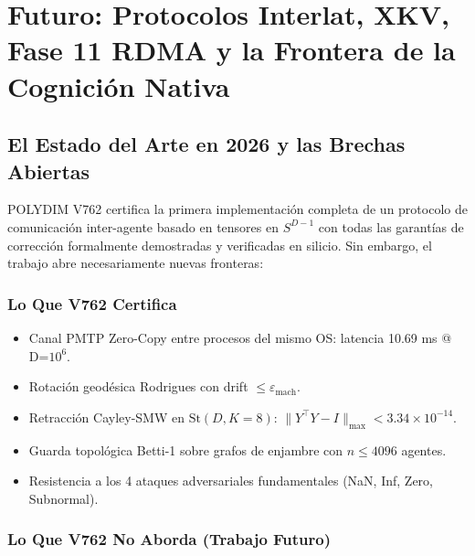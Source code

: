 \chapter{Futuro: Protocolos Interlat, XKV, Fase 11 RDMA y la Frontera de la Cognición Nativa}


\section{El Estado del Arte en 2026 y las Brechas Abiertas}

POLYDIM V762 certifica la primera implementación completa de un protocolo de
comunicación inter-agente basado en tensores en $S^{D-1}$ con todas las
garantías de corrección formalmente demostradas y verificadas en silicio.
Sin embargo, el trabajo abre necesariamente nuevas fronteras:

\subsection{Lo Que V762 Certifica}

\begin{itemize}
\item Canal PMTP Zero-Copy entre procesos del mismo OS: latencia 10.69 ms @ D=$10^6$.
\item Rotación geodésica Rodrigues con drift $\le \varepsilon_{\text{mach}}$.
\item Retracción Cayley-SMW en $\text{St}(D,K=8)$: $\|{Y^\top Y - I}\|_{\max} < 3.34\times10^{-14}$.
\item Guarda topológica Betti-1 sobre grafos de enjambre con $n \le 4096$ agentes.
\item Resistencia a los 4 ataques adversariales fundamentales (NaN, Inf, Zero, Subnormal).
\end{itemize}

\subsection{Lo Que V762 No Aborda (Trabajo Futuro)}

